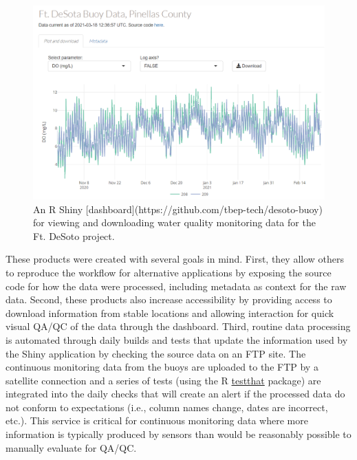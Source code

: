 \documentclass[
]{book}
\begin{document}
\begin{figure}

{\centering \includegraphics[width=1\linewidth]{img/desotoshiny} 

}

\caption{An R Shiny [dashboard](https://github.com/tbep-tech/desoto-buoy) for viewing and downloading water quality monitoring data for the Ft. DeSoto project.}\label{fig:desotoshiny}
\end{figure}

These products were created with several goals in mind. First, they allow others to reproduce the workflow for alternative applications by exposing the source code for how the data were processed, including metadata as context for the raw data. Second, these products also increase accessibility by providing access to download information from stable locations and allowing interaction for quick visual QA/QC of the data through the dashboard. Third, routine data processing is automated through daily builds and tests that update the information used by the Shiny application by checking the source data on an FTP site. The continuous monitoring data from the buoys are uploaded to the FTP by a satellite connection and a series of tests (using the R \href{https://testthat.r-lib.org/}{testthat} package) are integrated into the daily checks that will create an alert if the processed data do not conform to expectations (i.e., column names change, dates are incorrect, etc.). This service is critical for continuous monitoring data where more information is typically produced by sensors than would be reasonably possible to manually evaluate for QA/QC.
\end{document}
